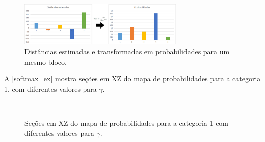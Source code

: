 \begin{figure}[H]
	\caption{\label{softmax_grafico}Distâncias estimadas e transformadas em probabilidades para um mesmo bloco.}
	\begin{center}
		\includegraphics[width=0.7\textwidth]{capitulo_2/softmax_bars_final.jpg}
	\end{center}
\end{figure}

A \autoref{softmax_ex} mostra seções em XZ do mapa de probabilidades para a categoria 1, com diferentes valores para $\gamma$.

\begin{figure}[H]
\caption{Seções em XZ do mapa de probabilidades para a categoria 1 com diferentes valores para $\gamma$.} 
\label{softmax_ex}
\begin{center}
\\
\end{center}
\begin{center}
\end{center}
\end{figure}

